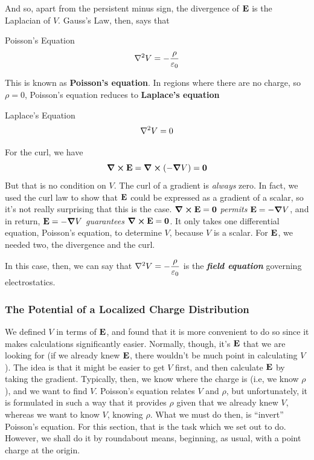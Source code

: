 		And so, apart from the persistent minus sign, the divergence of $\vb E$ is the 
		Laplacian of $V$. Gauss's Law, then, says that
		\begin{theorem}{Poisson's Equation}
			\begin{equation}\label{eq:poisson_theorem}
				\lpc V = -\frac{\rho}{\epsz} 
			\end{equation}	
		\end{theorem}
		This is known as \textbf{Poisson's equation}. In regions where there are no charge, so
		$\rho=0$, Poisson's equation reduces to \textbf{Laplace's equation}
		\begin{theorem}{Laplace's Equation}
		    \begin{equation}
		        \lpc V = 0
		    \end{equation}
		\end{theorem}
		For the curl, we have
		\[
			\curl\vb E = \curl(-\grad V) = \vb{0}
		\]
		But that is no condition on $V$. The curl of a gradient is \textit{always} zero. 
		In fact, we used the curl law to show that $\vb E$ could be expressed as a gradient
		of a scalar, so it's not really surprising that this is the case. $\curl\vb E = \vb{0}$
		\textit{permits} $\vb E = -\grad V$, and in return, $\vb E = -\grad V$ \textit{guarantees}
		$\curl\vb E = \vb{0}$. It only takes one differential equation, Poisson's equation,
		to determine $V$, because $V$ is a scalar. For $\vb E$, we needed two, the divergence 
		and the curl. 

		In this case, then, we can say that $\lpc V = - \dfrac{\rho}{\epsz}$ is the 
		\textbf{\textit{field equation}} governing electrostatics.
		
	\subsubsection{The Potential of a Localized Charge Distribution}
		We defined $V$ in terms of $\vb E$, and found that it is more convenient to do so since
		it makes calculations significantly easier. Normally, though, it's $\vb E$ that we are looking
		for (if we already knew $\vb E$, there wouldn't be much point in calculating $V$). The idea is that
		it might be easier to get $V$ first, and then calculate $\vb E$ by taking the gradient. Typically, then,
		we know where the charge is (i.e, we know $\rho$), and we want to find $V$. Poisson's equation
		relates $V$ and $\rho$, but unfortunately, it is formulated in such a way that it provides $\rho$
		given that we already knew $V$, whereas we want to know $V$, knowing $\rho$. What we must do then, is 
		``invert'' Poisson's equation. For this section, that is the task which we set out to do. However,
		 we shall do it by roundabout means, beginning, as usual, with a point charge at the origin.

